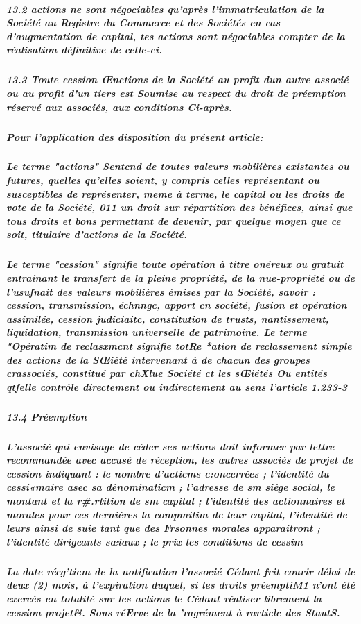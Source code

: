 \documentclass[a4paper, 11pt]{article}
\begin{document}
\subparagraph{
  13.2 actions ne sont négociables qu'après l'immatriculation de la Société au Registre du Commerce et des Sociétés en cas d'augmentation de capital, tes actions sont négociables compter de la réalisation définitive de celle-ci.
}

\subparagraph{
  13.3 Toute cession Œnctions de la Société au profit dun autre associé ou au profit d'un tiers est Soumise au respect du droit de préemption réservé aux associés, aux conditions Ci-après.
}

\subparagraph{
  Pour l'application des disposition du présent article:
}

\subparagraph{
  Le terme "actions" Sentcnd de toutes valeurs mobilières existantes ou futures, quelles qu'elles soient, y compris celles représentant ou susceptibles de représenter, meme à terme, le capital ou les droits de vote de la Société, 011 un droit sur répartition des bénéfices, ainsi que tous droits et bons permettant de devenir, par quelque moyen que ce soit, titulaire d'actions de la Société.
}

\subparagraph{
  Le terme "cession" signifie toute opération à titre onéreux ou gratuit entrainant le transfert de la pleine propriété, de la nue-propriété ou de l'usufnait des valeurs mobilières émises par la Société, savoir : cession, transmission, échnngc, apport cn société, fusion et opération assimilée, cession judiciaitc, constitution de trusts, nantissement, liquidation, transmission universelle de patrimoine. Le terme "Opératim de reclasxmcnt signifie totRe *ation de reclassement simple des actions de la SŒiété intervenant à de chacun des groupes crassociés, constitué par chXlue Société ct les sŒiétés Ou entités qtfelle contrôle directement ou indirectement au sens l'article 1.233-3
}

\subparagraph{
  13.4 Préemption
}

\subparagraph{
  L'associé qui envisage de céder ses actions doit informer par lettre recommandée avec accusé de réception, les autres associés de projet de cession indiquant :
  le nombre d'acticms c:oncerrées ;
  l'identité du cessi«maire asec sa dénominaticm ;
  l'adresse de sm siège social, le montant et la r#.rtition de sm capital ;
  l'identité des actionnaires et morales pour ces dernières la
  compmitim dc leur capital, l'identité de leurs ainsi de suie tant que des
  Frsonnes morales apparaitront ;
  l'identité dirigeants sœiaux ;
  le prix les conditions dc cessim
}

\subparagraph{
  La date récg'ticm de la notification l'associé Cédant frit courir délai de deux (2) mois, à l'expiration duquel, si les droits préemptiM1 n'ont été exercés en totalité sur les actions le Cédant réaliser librement la cession projet&. Sous réErve de la
  'ragrément à rarticlc des StautS.
}
\end{document}
